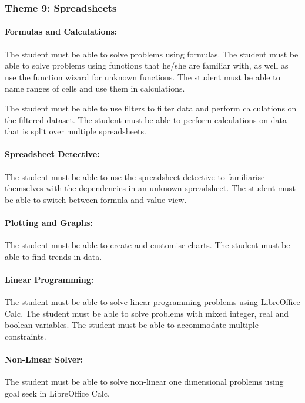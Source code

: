         \subsubsection{Theme 9: Spreadsheets}
            \paragraph{Formulas and Calculations:}
                The student must be able to solve problems using formulas. The
                student must be able to solve problems using functions that he/she
                are familiar with, as well as use the function wizard for unknown
                functions. The student must be able to name ranges of cells and use
                them in calculations.

                The student must be able to use filters to filter data and perform
                calculations on the filtered dataset. The student must be able to
                perform calculations on data that is split over multiple
                spreadsheets.

            \paragraph{Spreadsheet Detective:}
                The student must be able to use the spreadsheet detective to
                familiarise themselves with the dependencies in an unknown
                spreadsheet. The student must be able to switch between formula
                and value view.

            \paragraph{Plotting and Graphs:}
                The student must be able to create and customise charts. The
                student must be able to find trends in data.

            \paragraph{Linear Programming:}
                The student must be able to solve linear programming problems
                using LibreOffice Calc. The student must be able to solve
                problems with mixed integer, real and boolean variables. The
                student must be able to accommodate multiple constraints.

            \paragraph{Non-Linear Solver:}
                The student must be able to solve non-linear one dimensional
                problems using goal seek in LibreOffice Calc.

